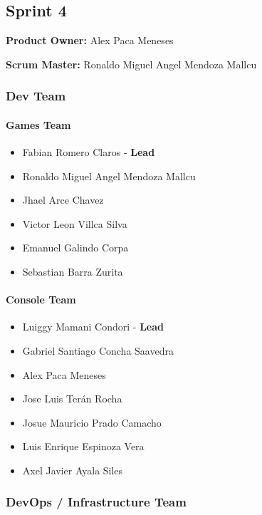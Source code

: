 \documentclass{article}
\providecommand{\tightlist}{
  \setlength{\itemsep}{0pt}\setlength{\parskip}{0pt}}
\begin{document}
\hypertarget{sprint4}{
\subsection{\texorpdfstring{\textbf{Sprint
4}}{Sprint 4}}\label{sprint4}}

\textbf{Product Owner: }
Alex Paca Meneses

\textbf{Scrum Master: }
Ronaldo Miguel Angel Mendoza Mallcu

\hypertarget{devteam-4}{
\subsubsection{\texorpdfstring{\textbf{Dev
Team}}{Dev Team}}\label{devteam-4}}

\paragraph{Games Team}\label{games-team-4}

\begin{itemize}
\tightlist
\item
  Fabian Romero Claros - \textbf{Lead}
\item
  Ronaldo Miguel Angel Mendoza Mallcu
\item
  Jhael Arce Chavez
\item
  Victor Leon Villca Silva
\item
  Emanuel Galindo Corpa
\item
  Sebastian Barra Zurita
\end{itemize}

\paragraph{Console Team}\label{console-team-4}

\begin{itemize}
\tightlist
\item
  Luiggy Mamani Condori - \textbf{Lead}
\item
  Gabriel Santiago Concha Saavedra
\item
  Alex Paca Meneses
\item
  Jose Luis Terán Rocha
\item
  Josue Mauricio Prado Camacho
\item
  Luis Enrique Espinoza Vera
\item
  Axel Javier Ayala Siles
\end{itemize}

\subsubsection{DevOps / Infrastructure Team}\label{devops-team-4}
\end{document}
